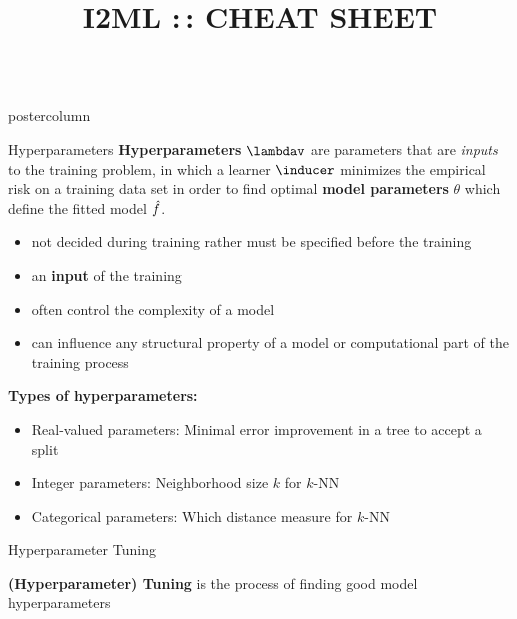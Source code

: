 \documentclass{beamer}
\title{I2ML :\,: CHEAT SHEET} %
\newlength{\columnheight} %
\begin{document}
\begin{frame}[fragile]{}
\begin{columns}
	\begin{column}{.31\textwidth}
		\begin{beamercolorbox}[center]{postercolumn}
			\begin{minipage}{.98\textwidth}
				\parbox[t][\columnheight]{\textwidth}{
					\begin{myblock}{Hyperparameters}
						\textbf{Hyperparameters} $\lambdav$ are parameters that are \emph{inputs} to the training problem, in which a learner $\inducer$ minimizes the empirical risk on a training data set in order to find optimal \textbf{model parameters} $\theta$ which define the fitted model $\hat{f}$.
						\begin{itemize}[$\bullet$]     
            \setlength{\itemindent}{+.3in}
                        \item not decided during training rather must be specified before the training
                        \item an \textbf{input} of the training
                        \item often control the complexity of a model
                        \item can influence any structural property of a model or computational part of the training process
                        \end{itemize}

						\begin{codebox}
			\textbf{Types of hyperparameters: }
						\end{codebox}
						\begin{itemize}[$\bullet$]     
            \setlength{\itemindent}{+.3in}
						    \item Real-valued parameters: Minimal error improvement in a tree to accept a split
						    \item Integer parameters: Neighborhood size $k$ for $k$-NN
						    \item Categorical parameters: Which distance measure for $k$-NN
						\end{itemize}
						\end{myblock}

						\begin{myblock}{Hyperparameter Tuning}

\textbf{(Hyperparameter) Tuning} is the process of finding good model hyperparameters


\end{myblock}}
\end{minipage}
\end{beamercolorbox}
\end{column}
\end{columns}
\end{frame}
\end{document}
